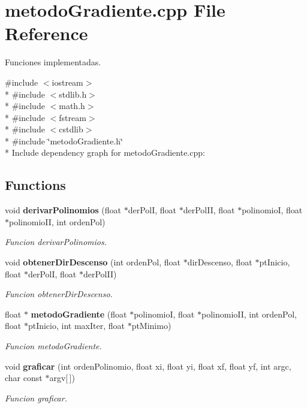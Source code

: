 \section{metodo\+Gradiente.\+cpp File Reference}
\label{metodo_gradiente_8cpp}


Funciones implementadas.  


{\ttfamily \#include $<$iostream$>$}\\*
{\ttfamily \#include $<$stdlib.\+h$>$}\\*
{\ttfamily \#include $<$math.\+h$>$}\\*
{\ttfamily \#include $<$fstream$>$}\\*
{\ttfamily \#include $<$cstdlib$>$}\\*
{\ttfamily \#include \char`\"{}metodo\+Gradiente.\+h\char`\"{}}\\*
Include dependency graph for metodo\+Gradiente.\+cpp\+:
\subsection*{Functions}
\begin{DoxyCompactItemize}
\item 
void {\bf derivar\+Polinomios} (float $\ast$der\+PolI, float $\ast$der\+Pol\+II, float $\ast$polinomioI, float $\ast$polinomio\+II, int orden\+Pol)
\begin{DoxyCompactList}\small\item\em Funcion derivar\+Polinomios. \end{DoxyCompactList}\item 
void {\bf obtener\+Dir\+Descenso} (int orden\+Pol, float $\ast$dir\+Descenso, float $\ast$pt\+Inicio, float $\ast$der\+PolI, float $\ast$der\+Pol\+II)
\begin{DoxyCompactList}\small\item\em Funcion obtener\+Dir\+Descenso. \end{DoxyCompactList}\item 
float $\ast$ {\bf metodo\+Gradiente} (float $\ast$polinomioI, float $\ast$polinomio\+II, int orden\+Pol, float $\ast$pt\+Inicio, int max\+Iter, float $\ast$pt\+Minimo)
\begin{DoxyCompactList}\small\item\em Funcion metodo\+Gradiente. \end{DoxyCompactList}\item 
void {\bf graficar} (int orden\+Polinomio, float xi, float yi, float xf, float yf, int argc, char const $\ast$argv[$\,$])
\begin{DoxyCompactList}\small\item\em Funcion graficar. \end{DoxyCompactList}\end{DoxyCompactItemize}


